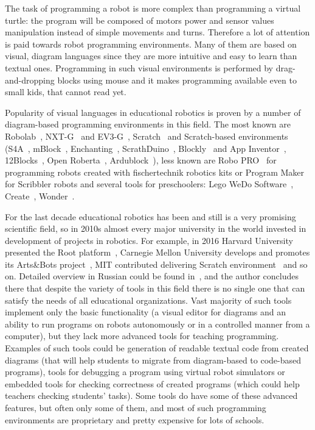 \documentclass[conference]{IEEEtran}
\begin{document}
The task of programming a robot is more complex than programming a virtual turtle: the program will be composed of motors power and sensor values manipulation instead of simple movements and turns. Therefore a lot of attention is paid towards robot programming environments. Many of them are based on visual, diagram languages since they are more intuitive and easy to learn than textual ones. Programming in such visual environments is performed by drag-and-dropping blocks using mouse and it makes programming available even to small kids, that cannot read yet. 

Popularity of visual languages in educational robotics is proven by a number of diagram-based programming environments in this field. The most known are Robolab~\cite{erwin2000lego}, NXT-G~\cite{kelly2010lego} and EV3-G~\cite{valk2014lego}, Scratch~\cite{resnick2009scratch} and Scratch-based environments (S4A~\cite{s4a}, mBlock~\cite{mblock}, Enchanting~\cite{enchanting}, ScrathDuino~\cite{scratchduino}, Blockly~\cite{blockly} and App Inventor~\cite{wolber2011app}, 12Blocks~\cite{12blocks}, Open Roberta~\cite{jost2014graphical}, Ardublock~\cite{ardublock}), less known are Robo PRO~\cite{chang2006incorporating} for programming robots created with fischertechnik robotics kits or Program Maker for Scribbler robots and several tools for preschoolers: Lego WeDo Software~\cite{mayerova2012pilot}, Create~\cite{cross2013visual}, Wonder~\cite{wonder}. 

For the last decade educational robotics has been and still is a very promising scientific field, so in 2010s almost every major university in the world invested in development of projects in robotics. For example, in 2016 Harvard University presented the Root platform~\cite{root}, Carnegie Mellon University develops and promotes its Arts\&Bots project~\cite{cross2013visual}, MIT contributed delivering Scratch environment~\cite{resnick2009scratch} and so on. Detailed overview in Russian could be found in~\cite{mordvinov2016NONPUBLISHED}, and the author concludes there that despite the variety of tools in this field there is no single one that can satisfy the needs of all educational organizations. Vast majority of such tools implement only the basic functionality (a visual editor for diagrams and an ability to run programs on robots autonomously or in a controlled manner from a computer), but they lack more advanced tools for teaching programming. Examples of such tools could be generation of readable textual code from created diagrams (that will help students to migrate from diagram-based to code-based programs), tools for debugging a program using virtual robot simulators or embedded tools for checking correctness of created programs (which could help teachers checking students' tasks). Some tools do have some of these advanced features, but often only some of them, and most of such programming environments are proprietary and pretty expensive for lots of schools.
\end{document}
